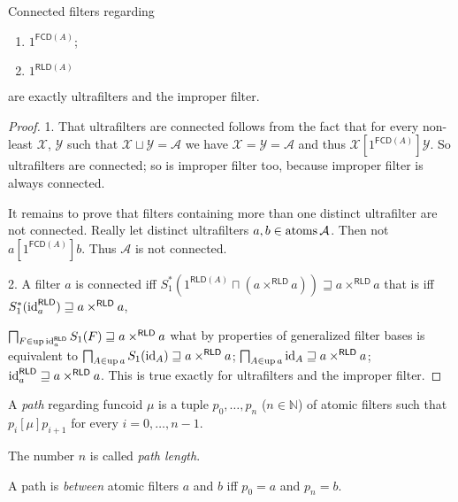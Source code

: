 \begin{prop}
  Connected filters regarding
  \begin{enumerate}
    \item $1^{\mathsf{FCD} (A)}$;

    \item $1^{\mathsf{RLD} (A)}$
  \end{enumerate}
  are exactly ultrafilters and the improper filter.
\end{prop}

\begin{proof}
  1. That ultrafilters are connected follows from the fact that for every
  non-least $\mathcal{X}$, $\mathcal{Y}$ such that $\mathcal{X} \sqcup
  \mathcal{Y} = \mathcal{A}$ we have $\mathcal{X} = \mathcal{Y} = \mathcal{A}$
  and thus $\mathcal{X} \mathrel{[1^{\mathsf{FCD} (A)}]} \mathcal{Y}$.
  So ultrafilters are connected; so is improper filter too, because improper
  filter is always connected.

  It remains to prove that filters containing more than one distinct
  ultrafilter are not connected. Really let distinct ultrafilters $a, b \in
  \operatorname{atoms} \mathcal{A}$. Then not $a \mathrel{[1^{\mathsf{FCD}
  (A)}]} b$. Thus $\mathcal{A}$ is not connected.

  2. A filter $a$ is connected iff $S^{\ast}_1 (1^{\mathsf{RLD} (A)}
  \sqcap (a \times^{\mathsf{RLD}} a)) \sqsupseteq a
  \times^{\mathsf{RLD}} a$ that is iff $S^{\ast}_1
  (\operatorname{id}^{\mathsf{RLD}}_a) \sqsupseteq a
  \times^{\mathsf{RLD}} a$,

  $\bigsqcap_{F \in \operatorname{up} \operatorname{id}^{\mathsf{RLD}}_a} S_1 (F)
  \sqsupseteq a \times^{\mathsf{RLD}} a$ what by properties of
  generalized filter bases is equivalent to $\bigsqcap_{A \in \operatorname{up} a} S_1
  (\operatorname{id}_A) \sqsupseteq a \times^{\mathsf{RLD}} a$; $\bigsqcap_{A
  \in \operatorname{up} a} \operatorname{id}_A \sqsupseteq a \times^{\mathsf{RLD}} a$;
  $\operatorname{id}^{\mathsf{RLD}}_a \sqsupseteq a
  \times^{\mathsf{RLD}} a$. This is true exactly for ultrafilters and
  the improper filter.
\end{proof}

\begin{defn}
  A \emph{path} regarding funcoid $\mu$ is a tuple $p_0, \ldots, p_n$ ($n
  \in \mathbb{N}$) of atomic filters such that $p_i \mathrel{[\mu]} p_{i +
  1}$ for every $i = 0, \ldots, n - 1$.

  The number $n$ is called \emph{path length}.

  A path is \emph{between} atomic filters $a$ and $b$ iff $p_0 = a$ and
  $p_n = b$.
\end{defn}

